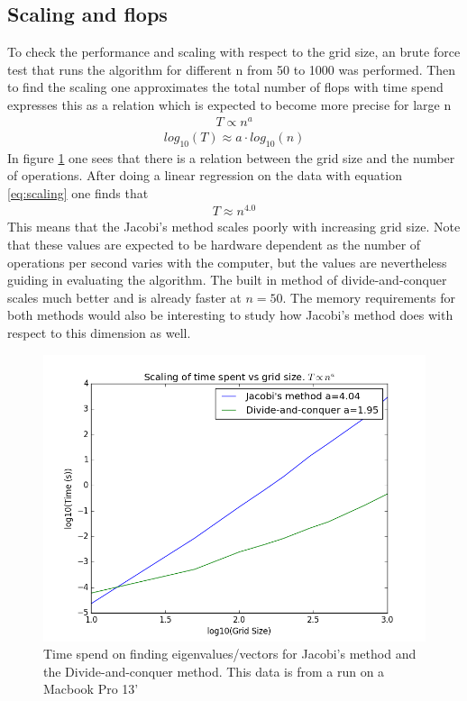 \documentclass[a4paper,11pt]{article}
\begin{document}
{\subsection{Scaling and flops}
To check the performance and scaling with respect to the grid size, an brute force test that runs the algorithm for different n from 50 to 1000 was performed. Then to find the scaling one approximates the total number of flops with time spend expresses this as a relation which is expected to become more precise for large n
\begin{align}
	T \propto n^{a} 
\end{align}
\begin{align}
	log_{10}(T) \approx a\cdot log_{10}(n)
	\label{eq:scaling}
\end{align}
In figure \ref{fig:scaling} one sees that there is a relation between the grid size and the number of operations. After doing a linear regression on the data with equation \ref{eq:scaling} one finds that 
\begin{align}
	T \approx n^{4.0}
\end{align}
This means that the Jacobi's method scales poorly with increasing grid size. Note that these values are expected to be hardware dependent as the number of operations per second varies with the computer, but the values are nevertheless guiding in evaluating the algorithm. The built in method of divide-and-conquer scales much better and is already faster at $n=50$. The memory requirements for both methods would also be interesting to study how Jacobi's method does with respect to this dimension as well. 
\begin{figure}
	\centering
	\includegraphics[scale=0.6]{Project2_scaling_time}
	\caption{Time spend on finding eigenvalues/vectors for Jacobi's method and the Divide-and-conquer method.  This data is from a run on a Macbook Pro 13' }
	\label{fig:scaling}
\end{figure}






}
\end{document}
